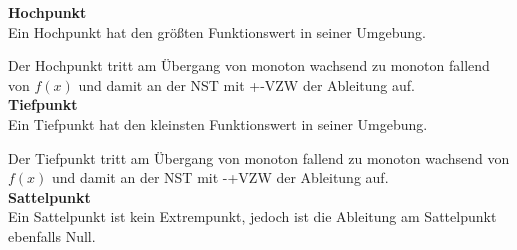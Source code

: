 \textbf{Hochpunkt}\\
Ein Hochpunkt hat den größten Funktionswert in seiner Umgebung.\\
\begin{minipage}{\textwidth}
\end{minipage}
\textcolor{loes}{Der Hochpunkt tritt am Übergang von monoton wachsend zu monoton fallend von \(f(x)\) und damit an der NST mit +-VZW der Ableitung auf.}\\
\textbf{Tiefpunkt}\\
Ein Tiefpunkt hat den kleinsten Funktionswert in seiner Umgebung.\\
\begin{minipage}{\textwidth}
\end{minipage}
\textcolor{loes}{Der Tiefpunkt tritt am Übergang von monoton fallend zu monoton wachsend von \(f(x)\) und damit an der NST mit -+VZW der Ableitung auf.}\\
\textbf{Sattelpunkt}\\
Ein Sattelpunkt ist kein Extrempunkt, jedoch ist die Ableitung am Sattelpunkt ebenfalls Null.\\
\begin{minipage}{\textwidth}
\end{minipage}

